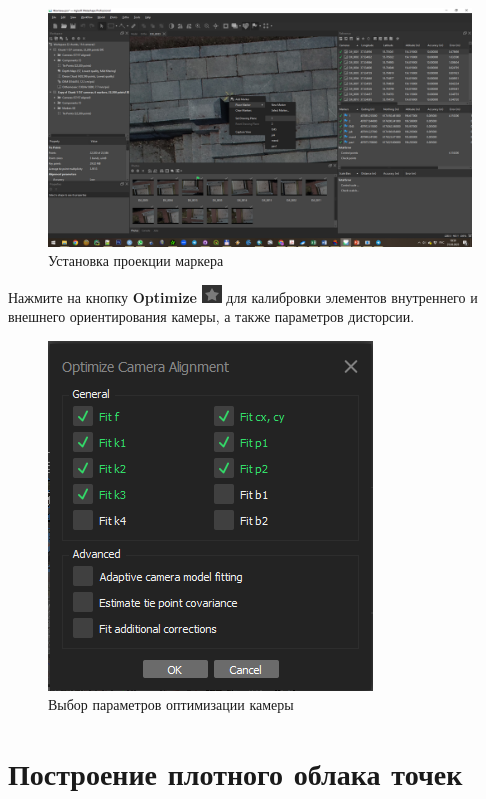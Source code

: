 \documentclass[
  12pt,
]{book}
\begin{document}
\begin{figure}
\centering
\includegraphics{images/Ref18/Place_Marker.png}
\caption{Установка проекции маркера}
\end{figure}

Нажмите на кнопку \textbf{Optimize} \includegraphics{images/Ref18/Optimize.png} для калибровки элементов внутреннего и внешнего ориентирования камеры, а также параметров дисторсии.

\begin{figure}
\centering
\includegraphics{images/Ref18/Optimize_Camera.png}
\caption{Выбор параметров оптимизации камеры}
\end{figure}

\hypertarget{agisoft-dense}{%
\section{Построение плотного облака точек}\label{agisoft-dense}}
\end{document}
